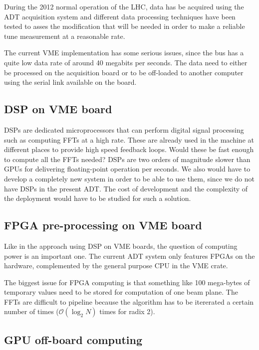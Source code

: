 During the 2012 normal operation of the \gls{LHC}, data has be acquired using the \gls{ADT} acquisition system and different data processing techniques have been tested to asses the modification that will be needed in order to make a reliable \gls{tune} measurement at a reasonable rate\cite{HofleChamonix12}.

The current \gls{VME} implementation has some serious issues, since the bus has a quite low data rate of around 40 megabits per seconds. The data need to either be processed on the acquisition board or to be off-loaded to another computer using the serial link available on the board\cite{Baudrenghien:1124094}.

\subsection{DSP on VME board}

\Glspl{DSP} are dedicated microprocessors that can perform digital
signal processing such as computing \glspl{FFT} at a high rate. These
are already used in the machine at different places to provide high
speed feedback loops. Would these be fast enough to compute all the
\glspl{FFT} needed? \glspl{DSP} are two orders of magnitude slower
than \glspl{GPU} for delivering floating-point operation per
seconds. We also would have to develop a completely new system in
order to be able to use them, since we do not have \glspl{DSP}
in the present \gls{ADT}. The cost of development and the complexity
of the deployment would have to be studied for such a solution.

\subsection{FPGA pre-processing on VME board}

Like in the approach using \gls{DSP} on VME boards, the question of
computing power is an important one. The current \gls{ADT} system only
features \glspl{FPGA} on the hardware, complemented by the general
purpose \gls{CPU} in the \gls{VME} crate.

The biggest issue for \gls{FPGA} computing is that something like 100
mega-bytes of temporary values need to be stored for computation of
one beam plane. The \glspl{FFT} are difficult to pipeline because the
algorithm has to be itererated a certain number of times
($\mathcal{O}(\log_{2} N)$ times for radix 2).

\subsection{GPU off-board computing}

